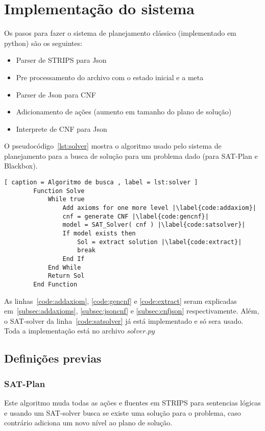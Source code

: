 \section{Implementação do sistema}
\label{sec:implementacao}

Os pasos para fazer o sistema de planejamento clássico (implementado em python) são os seguintes:
	\begin{itemize}
		\item Parser de STRIPS para Json
		\item Pre processamento do archivo com o estado inicial e a meta
		\item Parser de Json para CNF
		\item Adicionamento de ações (aumento em tamanho do plano de solução)
		\item Interprete de CNF para Json
	\end{itemize}
O pseudocódigo~\ref{lst:solver} mostra o algoritmo usado pelo sistema de planejamento para a busca de solução para um problema dado (para SAT-Plan e Blackbox).
	\renewcommand \lstlistingname{Pseudocódigo}
	\begin{lstlisting}[ caption = Algoritmo de busca , label = lst:solver ]
		Function Solve
			While true
				Add axioms for one more level |\label{code:addaxiom}|
				cnf = generate CNF |\label{code:gencnf}|
				model = SAT_Solver( cnf ) |\label{code:satsolver}|
				If model exists then
					Sol = extract solution |\label{code:extract}|
					break
				End If
			End While
			Return Sol
		End Function
	\end{lstlisting}
As linhas~\ref{code:addaxiom}, \ref{code:gencnf} e \ref{code:extract} seram explicadas em~\ref{subsec:addaxioms}, \ref{subsec:jsoncnf} e \ref{subsec:cnfjson} respectivamente. Além, o SAT-solver da linha~\ref{code:satsolver} já está implementado e só sera usado. Toda a implementação está no archivo ${solver.py}$


\subsection{Definições previas}
	\subsubsection{SAT-Plan}
	\label{subsub:satplan}
		Este algoritmo muda todas as ações e fluentes em STRIPS para sentencias lógicas e usando um SAT-solver busca se existe uma solução para o problema, caso contrário adiciona um novo nível ao plano de solução.
	
